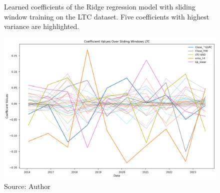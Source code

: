 \begin{figure}[!h]
    \centering
    \caption{Learned coefficients of the Ridge regression model
    with sliding window training on the LTC dataset. Five 
    coefficients with highest variance are highlighted.}
    \includegraphics[width=1\textwidth]{Figures/coefficient_values_sliding_ltc.png}
    \caption*{Source: Author}
    \label{fig:coefs_sliding_ltc}
\end{figure}



